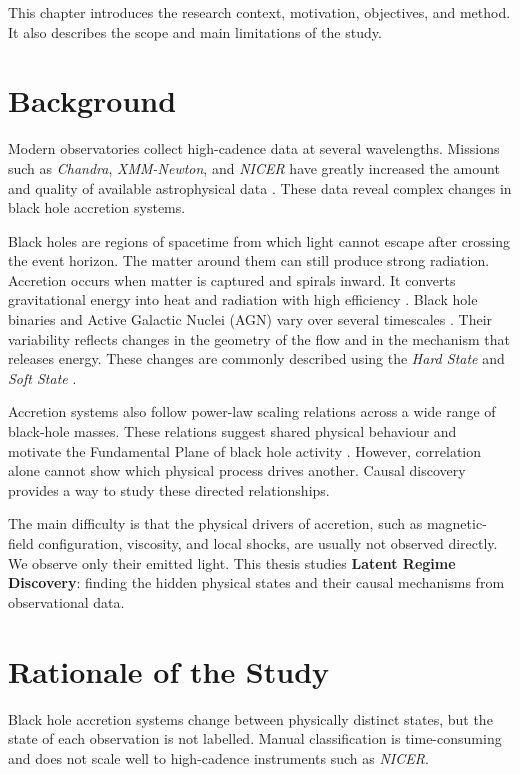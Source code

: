 This chapter introduces the research context, motivation, objectives, and method. It
also describes the scope and main limitations of the study.

\section{Background}
Modern observatories collect high-cadence data at several wavelengths. Missions such
as \textit{Chandra}, \textit{XMM-Newton}, and \textit{NICER} have greatly increased the
amount and quality of available astrophysical data \cite{weisskopf2002, jansen2001,
gendreau2012}. These data reveal complex changes in black hole accretion systems.

Black holes are regions of spacetime from which light cannot escape after crossing
the event horizon. The matter around them can still produce strong radiation.
Accretion occurs when matter is captured and spirals inward. It converts gravitational
energy into heat and radiation with high efficiency \cite{shakura1973, frank2002}.
Black hole binaries and Active Galactic Nuclei (AGN) vary over several timescales
\cite{remillard2006, done2007}. Their variability reflects changes in the geometry of
the flow and in the mechanism that releases energy. These changes are commonly
described using the \textit{Hard State} and \textit{Soft State}
\cite{fender2004}.

Accretion systems also follow power-law scaling relations across a wide range of
black-hole masses. These relations suggest shared physical behaviour and motivate
the Fundamental Plane of black hole activity \cite{merloni2003}. However, correlation
alone cannot show which physical process drives another. Causal discovery provides
a way to study these directed relationships.

The main difficulty is that the physical drivers of accretion, such as magnetic-field
configuration, viscosity, and local shocks, are usually not observed directly. We
observe only their emitted light. This thesis studies \textbf{Latent Regime Discovery}:
finding the hidden physical states and their causal mechanisms from observational
data.

\section{Rationale of the Study}
Black hole accretion systems change between physically distinct states, but the state
of each observation is not labelled. Manual classification is time-consuming and does
not scale well to high-cadence instruments such as \textit{NICER}.

